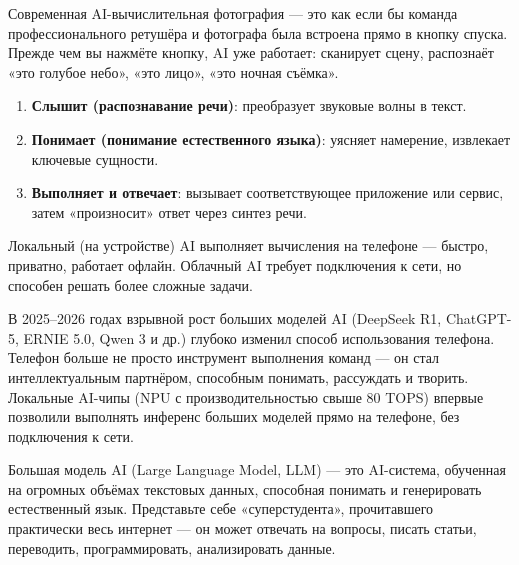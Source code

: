 


Современная AI-вычислительная фотография — это как если бы команда профессионального ретушёра и фотографа была встроена прямо в кнопку спуска. Прежде чем вы нажмёте кнопку, AI уже работает: сканирует сцену, распознаёт «это голубое небо», «это лицо», «это ночная съёмка».


\begin{enumerate}
  \item \textbf{Слышит (распознавание речи)}: преобразует звуковые волны в текст.
  \item \textbf{Понимает (понимание естественного языка)}: уясняет намерение, извлекает ключевые сущности.
  \item \textbf{Выполняет и отвечает}: вызывает соответствующее приложение или сервис, затем «произносит» ответ через синтез речи.
\end{enumerate}


Локальный (на устройстве) AI выполняет вычисления на телефоне — быстро, приватно, работает офлайн. Облачный AI требует подключения к сети, но способен решать более сложные задачи.


В 2025–2026 годах взрывной рост больших моделей AI (DeepSeek R1, ChatGPT-5, ERNIE 5.0, Qwen 3 и др.) глубоко изменил способ использования телефона. Телефон больше не просто инструмент выполнения команд — он стал интеллектуальным партнёром, способным понимать, рассуждать и творить. Локальные AI-чипы (NPU с производительностью свыше 80 TOPS) впервые позволили выполнять инференс больших моделей прямо на телефоне, без подключения к сети.


Большая модель AI (Large Language Model, LLM) — это AI-система, обученная на огромных объёмах текстовых данных, способная понимать и генерировать естественный язык. Представьте себе «суперстудента», прочитавшего практически весь интернет — он может отвечать на вопросы, писать статьи, переводить, программировать, анализировать данные.

